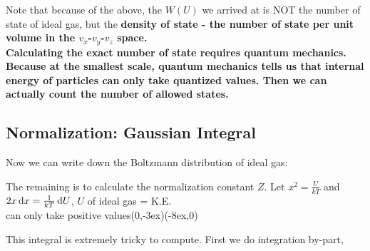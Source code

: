 \documentclass[class=article, crop=false, 12pt]{standalone}
\begin{document}
\begin{notation}
    Note that because of the  above,
    the $W(U)$ we arrived at is NOT the number of state of ideal gas,
    but the \bf{density of state} - the number of state per unit volume in the $v_x$-$v_y$-$v_z$ space.\\

    Calculating the exact number of state requires quantum mechanics.
    Because at the smallest scale, 
    quantum mechanics tells us that internal energy of particles can only take quantized values.
    Then we can actually count the number of allowed states.
\end{notation}


\subsection{Normalization: Gaussian Integral}

Now we can write down the Boltzmann distribution of ideal gas:

The remaining is to calculate the normalization constant $Z$. 
Let $x^2 = \frac{U}{kT}$ and $2x\dd{x} = \frac{1}{kT}\dd{U}$,
{\scriptsize $U$ of ideal gas = K.E.\\[-1ex]\scriptsize can only take positive values}{(0,-3ex)}{(-8ex,0)}

This integral is extremely tricky to compute.
First we do integration by-part,
\end{document}
